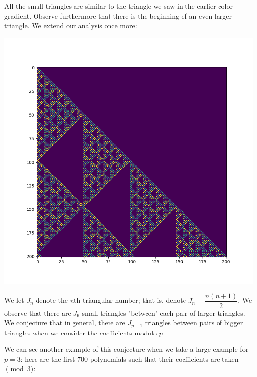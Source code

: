 \documentclass[12pt, letterpaper]{article} %
\begin{document}
All the small triangles are similar to the triangle we saw in the earlier color gradient. Observe furthermore that there is the beginning of an even larger triangle. We extend our analysis once more:

\begin{center}
      \includegraphics[scale=0.44]{200mod7.png}
\end{center}

We let $J_n$ denote the $n$th triangular number; that is, denote $J_n = \dfrac{n(n+1)}{2}$. We observe that there are $J_6$ small triangles "between" each pair of larger triangles. We conjecture that in general, there are $J_{p-1}$ triangles between pairs of bigger triangles when we consider the coefficients modulo $p$. \newpage

We can see another example of this conjecture when we take a large example for $p = 3$: here are the first $700$ polynomials such that their coefficients are taken $\pmod{3}$:
\end{document}

